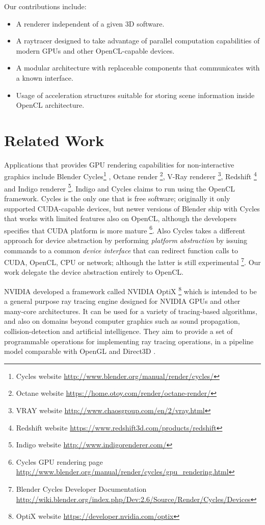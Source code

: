 \documentclass{vgtc}
\begin{document}
Our contributions include:

\begin{itemize}
  \item A renderer independent of a given 3D software.
  \item A raytracer designed to take advantage of parallel
    computation capabilities of modern GPUs and other OpenCL-capable
    devices.
  \item A modular architecture with replaceable components that
    communicates with a known interface.
  \item Usage of acceleration structures suitable for storing scene
    information inside OpenCL architecture.

\end{itemize}

\section{Related Work}
\label{sec:related-work}

Applications that provides GPU rendering capabilities for
non-interactive graphics include Blender Cycles\footnote{Cycles
  website \url{http://www.blender.org/manual/render/cycles/}} , Octane
render \footnote{Octane website
  \url{https://home.otoy.com/render/octane-render/}}, V-Ray renderer
\footnote{VRAY website
  \url{http://www.chaosgroup.com/en/2/vray.html}}, Redshift
\footnote{Redshift website
  \url{https://www.redshift3d.com/products/redshift}} and Indigo
renderer \footnote{Indigo website
  \url{http://www.indigorenderer.com/}}. Indigo and Cycles claims to
run using the OpenCL framework. Cycles is the only one that is free
software; originally it only supported CUDA-capable devices, but newer
versions of Blender ship with Cycles that works with limited features
also on OpenCL, although the developers specifies that CUDA platform
is more mature \footnote{Cycles GPU rendering page
  \url{http://www.blender.org/manual/render/cycles/gpu_rendering.html}}.
Also Cycles takes a different approach for device abstraction by
performing \emph{platform abstraction} by issuing commands to a common
\emph{device interface} that can redirect function calls to CUDA,
OpenCL, CPU or network; although the latter is still experimental
\footnote{Blender Cycles Developer Documentation
  \url{http://wiki.blender.org/index.php/Dev:2.6/Source/Render/Cycles/Devices}}. Our
work delegate the device abstraction entirely to OpenCL.

NVIDIA developed a framework called NVIDIA OptiX \footnote{OptiX
  website \url{https://developer.nvidia.com/optix}} which is intended
to be a general purpose ray tracing engine designed for NVIDIA GPUs
and other many-core architectures. It can be used for a variety of
tracing-based algorithms, and also on domains beyond computer graphics
such as sound propagation, collision-detection and artificial
intelligence. They aim to provide a set of programmable operations for
implementing ray tracing operations, in a pipeline model comparable
with OpenGL and Direct3D \cite{Parker:2010:OGP:1778765.1778803}.
\end{document}

